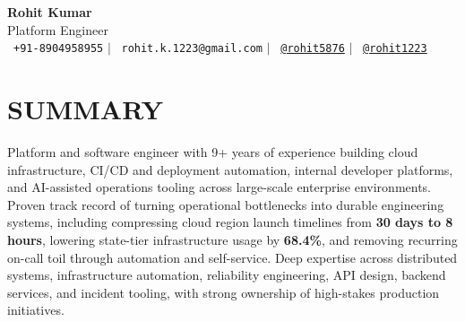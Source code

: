 \documentclass[letterpaper,11pt]{article}
\begin{document}
\begin{center}
    \textbf{\Huge Rohit Kumar} \\ \vspace{3pt}
    {\large Platform Engineer} \\ \vspace{5pt}
    \small \faPhone*\ \texttt{+91-8904958955} \hspace{1pt} $|$
    \hspace{1pt} \faEnvelope\ \texttt{rohit.k.1223@gmail.com} \hspace{1pt} $|$
    \hspace{1pt} \faLinkedin\ \href{https://www.linkedin.com/in/rohit5876}{\texttt{@rohit5876}} \hspace{1pt} $|$
    \hspace{1pt} \faGithub\ \href{https://github.com/rohit1223}{\texttt{@rohit1223}} \hspace{1pt} \\ \vspace{-3pt}
\end{center}

\section{SUMMARY}
\begin{itemize}[leftmargin=0in, label={}]
    \small{\item{Platform and software engineer with 9+ years of experience building cloud infrastructure, CI/CD and deployment automation, internal developer platforms, and AI-assisted operations tooling across large-scale enterprise environments. Proven track record of turning operational bottlenecks into durable engineering systems, including compressing cloud region launch timelines from \textbf{30 days to 8 hours}, lowering state-tier infrastructure usage by \textbf{68.4\%}, and removing recurring on-call toil through automation and self-service. Deep expertise across distributed systems, infrastructure automation, reliability engineering, API design, backend services, and incident tooling, with strong ownership of high-stakes production initiatives.}}
\end{itemize}

\end{document}

